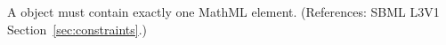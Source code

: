 A \Constraint object must contain exactly one MathML  element.
(References: SBML L3V1 Section~\ref{sec:constraints}.)
